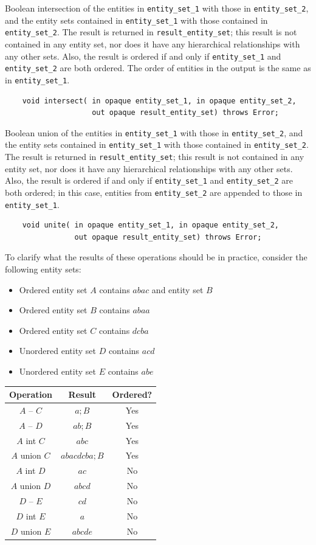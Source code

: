 \documentclass{article}
\begin{document}
Boolean intersection of the entities in {\tt entity\_set\_1} with those 
in {\tt entity\_set\_2}, and the entity sets contained in {\tt entity\_set\_1} 
with those contained in {\tt entity\_set\_2}. The result is 
returned in {\tt result\_entity\_set}; this result is not contained 
in any entity set, nor does it have any hierarchical relationships 
with any other sets. Also, the result is ordered if and 
only if {\tt entity\_set\_1} and {\tt entity\_set\_2} are both ordered. The 
order of entities in the output is the same as in {\tt entity\_set\_1}.
\begin{verbatim}
    void intersect( in opaque entity_set_1, in opaque entity_set_2,
                    out opaque result_entity_set) throws Error;
\end{verbatim}

Boolean union of the entities in {\tt entity\_set\_1} with those in 
{\tt entity\_set\_2}, and the entity sets contained in {\tt entity\_set\_1} 
with those contained in {\tt entity\_set\_2}. The result is 
returned in {\tt result\_entity\_set}; this result is not contained 
in any entity set, nor does it have any hierarchical relationships 
with any other sets. Also, the result is ordered if and 
only if {\tt entity\_set\_1} and {\tt entity\_set\_2} are both ordered; in 
this case, entities from {\tt entity\_set\_2} are appended to those 
in {\tt entity\_set\_1}.
\begin{verbatim}
    void unite( in opaque entity_set_1, in opaque entity_set_2,
                out opaque result_entity_set) throws Error;
\end{verbatim}

To clarify what the results of these operations should be in 
practice, consider the following entity sets:
\begin{itemize}
\item Ordered entity set $A$ contains $abac$ and entity set $B$
\item Ordered entity set $B$ contains $abaa$
\item Ordered entity set $C$ contains $dcba$
\item Unordered entity set $D$ contains $acd$
\item Unordered entity set $E$ contains $abe$
\end{itemize}

\begin{tabular}{ccc}
\textbf{Operation} & \textbf{Result}  &\textbf{Ordered?}\\
\hline
$A$ -- $C$ & $a;B$  &Yes\\
$A$ -- $D$  &$ab;B$ & Yes\\
$A$ int $C$ & $abc$  &Yes\\
$A$ union $C$ & $abacdcba;B$  &Yes\\
$A$ int $D$ & $ac$  &No\\
$A$ union $D$ & $abcd$  &No\\
$D$ -- $E$  &$cd$ & No\\
$D$ int $E$ & $a$  &No\\
$D$ union $E$ & $abcde$  &No\\
\end{tabular}
\end{document}
